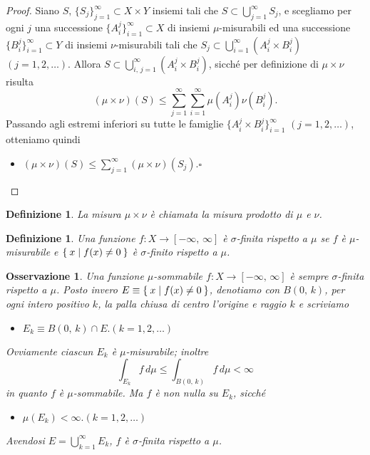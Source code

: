 \documentclass[a4paper,10pt,openright,oneside]{book}
\theoremstyle{theoremstyle}
\theoremstyle{theoremstylewoheader}
\theoremstyle{theoremstyle}
\newtheorem{definizione}[teorema]{Definizione}
\newtheorem{osservazione}[teorema]{Osservazione}
\theoremstyle{proofsecstyle}
\theoremstyle{nonumberplain}
\newtheorem{proof}{Dim.}
\renewcommand{\qedsymbol}{\ensuremath{\square}}
\newcommand{\mymath}[2]{\begin{itemize}%
  \item[]\hfill\hbox{}\ensuremath{\displaystyle #1}\hfill\ensuremath{\displaystyle #2}%
  \end{itemize}}
\begin{document}
\begin{proof}
Siano $S,\, \{S_j\}_{j=1}^\infty \subset X \times Y$ insiemi tali che $S \subset \bigcup_{j=1}^\infty S_j$, e scegliamo per ogni $j$ una successione $\{A_i^j\}_{i=1}^\infty \subset X$ di insiemi $\mu$-misurabili ed una successione $\{B_i^j\}_{i=1}^\infty \subset Y$ di insiemi $\nu$-misurabili tali che $S_j \subset \bigcup_{i=1}^\infty (A_i^j \times B_i^j)$ $(j = 1, 2, \ldots)$. Allora $S \subset \bigcup_{i,\, j = 1}^\infty (A_i^j \times B_i^j)$, sicché per definizione di $\mu\times\nu$ risulta
\[
(\mu\times\nu)(S) \le \sum_{j=1}^\infty \sum_{i=1}^\infty \mu(A_i^j)\nu(B_i^j).
\]
Passando agli estremi inferiori su tutte le famiglie $\{A_i^j \times B_i^j\}_{i=1}^\infty$ $(j = 1, 2, \ldots)$, otteniamo quindi
\mymath{(\mu\times\nu)(S) \le \sum_{j=1}^\infty (\mu\times\nu)(S_j).}{\qedsymbol}
\end{proof}

\begin{definizione}
\label{def:misura_prodotto}
La misura $\mu\times\nu$ è chiamata la \emph{misura prodotto} di $\mu$ e $\nu$.
\end{definizione}

\begin{definizione}
\label{def:funzione_sigma_finita}
Una funzione $f : X \rightarrow [-\infty,\, \infty]$ è \emph{$\sigma$-finita rispetto a $\mu$} se $f$ è $\mu$-misurabile e $\Set{ x | f(x) \ne 0 }$ è $\sigma$-finito rispetto a $\mu$.
\end{definizione}

\begin{osservazione}
Una funzione $\mu$-sommabile $f : X \rightarrow [-\infty,\, \infty]$ è sempre $\sigma$-finita rispetto a $\mu$. Posto invero $E \equiv \Set{ x | f(x) \ne 0 }$, denotiamo con $B(0,\, k)$, per ogni intero positivo $k$, la palla chiusa di centro l'origine e raggio $k$ e scriviamo \mymath{E_k \equiv B(0,\, k) \cap E.}{(k = 1, 2, \ldots)} Ovviamente ciascun $E_k$ è $\mu$-misurabile; inoltre
\[
\int_{E_k} f\, d\mu \le \int_{B(0,\, k)} f\, d\mu < \infty
\]
in quanto $f$ è $\mu$-sommabile. Ma $f$ è non nulla su $E_k$, sicché \mymath{\mu(E_k) < \infty.}{(k = 1, 2, \ldots)} Avendosi $E = \bigcup_{k=1}^\infty E_k$, $f$ è $\sigma$-finita rispetto a $\mu$.
\end{osservazione}
\end{document}
